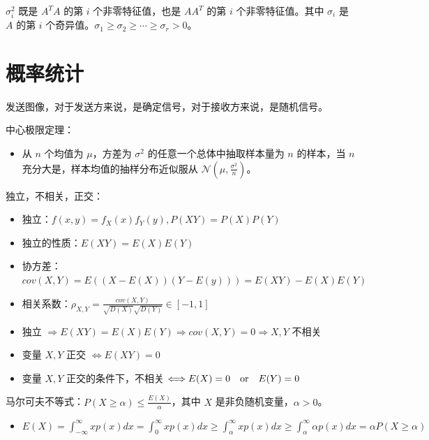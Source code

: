 \begin{remark}
    $\sigma_i^2$ 既是 $A^TA$ 的第 $i$ 个非零特征值，也是 $AA^T$ 的第 $i$ 个非零特征值。其中 $\sigma_i$ 是 $A$ 的第 $i$ 个奇异值。$\sigma_1 \ge \sigma_2 \ge \cdots \ge \sigma_r > 0$。
\end{remark}

\section{概率统计}
\begin{remark}
    发送图像，对于发送方来说，是确定信号，对于接收方来说，是随机信号。
\end{remark}

\begin{remark}
    中心极限定理：
    \begin{itemize}
        \item 从 $n$ 个均值为 $\mu$，方差为 $\sigma^2$ 的任意一个总体中抽取样本量为 $n$ 的样本，当 $n$ 充分大是，样本均值的抽样分布近似服从 $\mathcal{N}(\mu, \frac{\sigma^2}{n})$。
    \end{itemize}
\end{remark}

\begin{remark}
    独立，不相关，正交：
    \begin{itemize}
        \item 独立：$f(x, y) = f_X(x)f_Y(y), P(XY) = P(X)P(Y)$
        \item 独立的性质：$E(XY) = E(X)E(Y)$
        \item 协方差：$cov(X, Y) = E((X - E(X))(Y - E(y))) = E(XY) - E(X)E(Y)$
        \item 相关系数：$\rho_{X, Y} = \frac{cov(X, Y)}{\sqrt{D(X)}\sqrt{D(Y)}} \in \left[-1, 1\right]$
        \item 独立 $\Rightarrow E(XY) = E(X)E(Y) \Rightarrow cov(X, Y) = 0 \Rightarrow X, Y$ 不相关 
        \item 变量 $X,Y$ 正交 $\Leftrightarrow E(XY) = 0$
        \item 变量 $X,Y$ 正交的条件下，不相关 $\Longleftrightarrow E(X) = 0 \qor E(Y) = 0$
    \end{itemize}
\end{remark}

\begin{remark}
    马尔可夫不等式：$P(X \ge \alpha) \le \frac{E(X)}{\alpha}$，其中 $X$ 是非负随机变量，$\alpha > 0$。 
    \begin{itemize}
        \item $E(X) = \int_{-\infty}^{\infty}xp(x)dx = \int_{0}^{\infty}xp(x)dx \ge \int_{\alpha}^{\infty}xp(x)dx \ge \int_{\alpha}^{\infty}\alpha p(x)dx = \alpha P(X \ge \alpha)$
    \end{itemize}
\end{remark}


